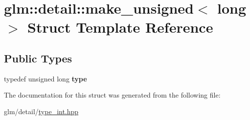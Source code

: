 \hypertarget{structglm_1_1detail_1_1make__unsigned_3_01long_01_4}{\section{glm\-:\-:detail\-:\-:make\-\_\-unsigned$<$ long $>$ Struct Template Reference}
\label{structglm_1_1detail_1_1make__unsigned_3_01long_01_4}
}
\subsection*{Public Types}
\begin{DoxyCompactItemize}
\item 
\hypertarget{structglm_1_1detail_1_1make__unsigned_3_01long_01_4_ade0cc74f63e30969e7d7b42eb6ac8289}{typedef unsigned long {\bfseries type}}\label{structglm_1_1detail_1_1make__unsigned_3_01long_01_4_ade0cc74f63e30969e7d7b42eb6ac8289}

\end{DoxyCompactItemize}


The documentation for this struct was generated from the following file\-:\begin{DoxyCompactItemize}
\item 
glm/detail/\hyperlink{type__int_8hpp}{type\-\_\-int.\-hpp}\end{DoxyCompactItemize}
